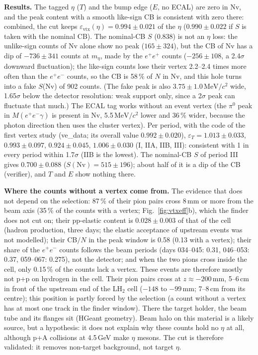 \documentclass[11pt,a4paper]{article}
\newcommand{\piz}{\ensuremath{\pi^{0}}\xspace}
\newcommand{\ee}{\ensuremath{e^{+}e^{-}}\xspace}
\newcommand{\MeVcc}{\ensuremath{\mathrm{MeV}/c^{2}}\xspace}
\begin{document}
\textbf{Results.} The tagged $\eta$ ($T$) and the bump edge ($E$, no ECAL) are zero in Nv, and the peak content with a smooth like-sign CB is
consistent with zero there: combined, the cut keeps $\varepsilon_{\mathrm{vtx}}(\eta)=0.994\pm0.021$ of the $\eta$ ($0.990\pm0.022$ if $S$ is
taken with the nominal CB). The nominal-CB $S$ (0.838) is not an $\eta$ loss: the unlike-sign counts of Nv alone show no peak ($165\pm324$), but
the CB of Nv has a dip of $-736\pm341$ counts at $m_\eta$, made by the $e^+e^+$ counts ($-256\pm108$, a 2.4$\sigma$ downward fluctuation); the
like-sign counts lose their vertex 2.2--2.4 times more often than the \ee counts, so the CB is 58\,\% of $N$ in Nv, and this hole turns into a fake
$S$(Nv) of 902 counts. (The fake peak is also $3.75\pm1.0$\,\MeVcc wide, 1.65$\sigma$ below the detector resolution: weak support only, since a
2$\sigma$ peak can fluctuate that much.) The ECAL tag works without an event vertex (the \piz peak in $M(\ee\gamma)$ is present in Nv,
5.5\,\MeVcc lower and 36\,\% wider, because the photon direction then uses the cluster vertex). Per period, with the code of the first vertex
study (ve\_data; its overall value $0.992\pm0.020$), $\varepsilon_T=1.013\pm0.033$, $0.993\pm0.097$, $0.924\pm0.045$, $1.006\pm0.030$ (I, IIA,
IIB, III): consistent with 1 in every period within 1.7$\sigma$ (IIB is the lowest). The nominal-CB $S$ of period III gives $0.700\pm0.088$
($S(\mathrm{Nv})=515\pm196$); about half of it is a dip of the CB (verifier), and $T$ and $E$ show nothing there.

\textbf{Where the counts without a vertex come from.} The evidence that does not depend on the selection: 87\,\% of their pion pairs cross
8\,mm or more from the beam axis (35\,\% of the counts with a vertex; Fig.~\ref{fig:vtxeff}b), which the finder does not cut on; their pp-elastic
content is $0.028\pm0.003$ of that of the cell (hadron production, three days; the elastic acceptance of upstream events was not modelled); their
CB$/N$ in the peak window is 0.58 (0.13 with a vertex); their share of the \ee counts follows the beam periods (days 034--045: 0.31, 046--053:
0.37, 059--067: 0.275), not the detector; and when the two pions cross inside the cell, only 0.15\,\% of the counts lack a vertex. These events
are therefore mostly not p+p on hydrogen in the cell. Their pion pairs cross at $z\approx-200$\,mm, 5--6\,cm in front of the upstream end of the
LH$_2$ cell ($-148$ to $-99$\,mm; 7--8\,cm from its centre); this position is partly forced by the selection (a count without a vertex has at most
one track in the finder window). There the target holder, the beam tube and its flanges sit (HGeant geometry). Beam halo on this material is a
likely source, but a hypothesis: it does not explain why these counts hold no $\eta$ at all, although p+A collisions at 4.5\,GeV make $\eta$
mesons. The cut is therefore validated: it removes non-target background, not target $\eta$.
\end{document}
